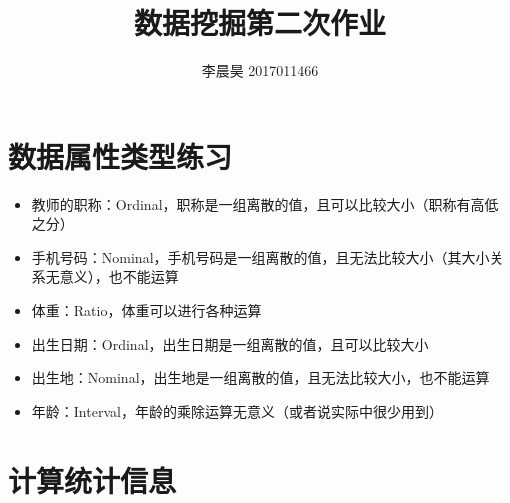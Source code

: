 \documentclass[12pt, UTF8]{article}
\title{数据挖掘第二次作业}
\author{李晨昊 2017011466}
\begin{document}
\maketitle
\tableofcontents

\section{数据属性类型练习}

\begin{itemize}
  \item 教师的职称：Ordinal，职称是一组离散的值，且可以比较大小（职称有高低之分）
  \item 手机号码：Nominal，手机号码是一组离散的值，且无法比较大小（其大小关系无意义），也不能运算
  \item 体重：Ratio，体重可以进行各种运算
  \item 出生日期：Ordinal，出生日期是一组离散的值，且可以比较大小
  \item 出生地：Nominal，出生地是一组离散的值，且无法比较大小，也不能运算
  \item 年龄：Interval，年龄的乘除运算无意义（或者说实际中很少用到）
\end{itemize}

\section{计算统计信息}
\end{document}
